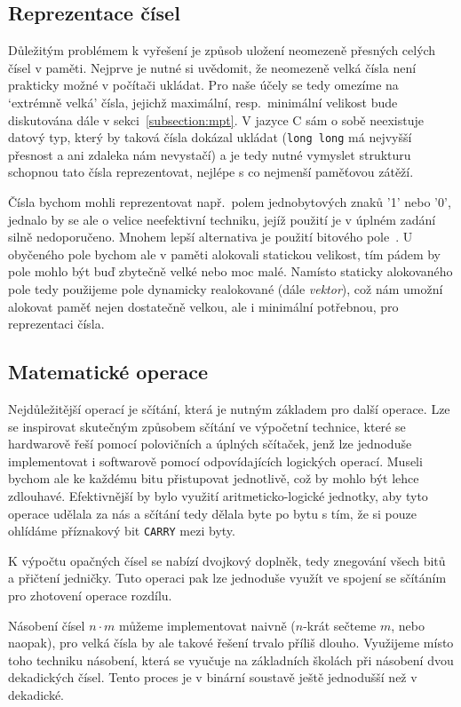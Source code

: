 \subsection{Reprezentace čísel}
Důležitým problémem k vyřešení je způsob uložení neomezeně přesných celých čísel v paměti. Nejprve je nutné si uvědomit, že neomezeně velká čísla není prakticky možné v počítači ukládat. Pro naše účely se tedy omezíme na `extrémně velká' čísla, jejichž maximální, resp.~minimální velikost bude diskutována dále v sekci~\ref{subsection:mpt}. V jazyce C sám o sobě neexistuje datový typ, který by taková čísla dokázal ukládat (\verb|long long| má nejvyšší přesnost a ani zdaleka nám nevystačí) a je tedy nutné vymyslet strukturu schopnou tato čísla reprezentovat, nejlépe s co nejmenší paměťovou zátěží. 

Čísla bychom mohli reprezentovat např.~polem jednobytových znaků '1' nebo '0', jednalo by se ale o velice neefektivní techniku, jejíž použití je v úplném zadání~\cite{bib:zadani} silně nedoporučeno. Mnohem lepší alternativa je použití bitového pole~\cite{bib:bit_array}. U obyčeného pole bychom ale v paměti alokovali statickou velikost, tím pádem by pole mohlo být buď zbytečně velké nebo moc malé. Namísto staticky alokovaného pole tedy použijeme pole dynamicky realokované (dále \textit{vektor}), což nám umožní alokovat paměť nejen dostatečně velkou, ale i minimální potřebnou, pro reprezentaci čísla.

\subsection{Matematické operace}\label{subsection:operace}
Nejdůležitější operací je sčítání, která je nutným základem pro další operace. Lze se inspirovat skutečným způsobem sčítání ve výpočetní technice, které se hardwarově řeší pomocí polovičních a úplných sčítaček, jenž lze jednoduše implementovat i softwarově pomocí odpovídajících logických operací. Museli bychom ale ke každému bitu přistupovat jednotlivě, což by mohlo být lehce zdlouhavé. Efektivnější by bylo využití aritmeticko-logické jednotky, aby tyto operace udělala za nás a sčítání tedy dělala byte po bytu s tím, že si pouze ohlídáme příznakový bit \verb|CARRY| mezi byty. 

K výpočtu opačných čísel se nabízí dvojkový doplněk, tedy znegování všech bitů a přičtení jedničky. Tuto operaci pak lze jednoduše využít ve spojení se sčítáním pro zhotovení operace rozdílu.

Násobení čísel $n\cdot{} m$ můžeme implementovat naivně ($n$-krát sečteme $m$, nebo naopak), pro velká čísla by ale takové řešení trvalo příliš dlouho. Využijeme místo toho techniku násobení, která se vyučuje na základních školách při násobení dvou dekadických čísel. Tento proces je v binární soustavě ještě jednodušší než v dekadické.
\newpage

